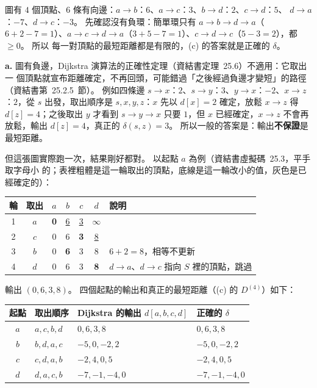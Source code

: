 \begin{pastsoln}
圖有 $4$ 個頂點、$6$ 條有向邊：$a \to b$：$6$、$a \to c$：$3$、$b \to d$：$2$、$c \to d$：$5$、
$d \to a$：$-7$、$d \to c$：$-3$。 先確認沒有負環：簡單環只有 $a \to b \to d \to a$（$6 + 2 - 7 =
1$）、$a \to c \to d \to a$（$3 + 5 - 7 = 1$）、$c \to d \to c$（$5 - 3 = 2$），都 $\ge 0$。 所以
每一對頂點的最短距離都是有限的，(c) 的答案就是正確的 $\delta$。

\textbf{a.} 圖有負邊，Dijkstra 演算法的正確性定理（資結書定理~25.6）不適用：它取出一
個頂點就宣布距離確定，不再回頭，可能錯過「之後經過負邊才變短」的路徑（資結書第~25.2.5~節）。
例如四條邊 $s \to x$：$2$、$s \to y$：$3$、$y \to x$：$-2$、$x \to z$：$2$，從 $s$ 出發，取出順序是
$s, x, y, z$：$x$ 先以 $d[x] = 2$ 確定，放鬆 $x \to z$ 得 $d[z] = 4$；之後取出 $y$ 才看到 $s \to y \to x$ 只要
$1$，但 $x$ 已經確定，$x \to z$ 不會再放鬆，輸出 $d[z] = 4$，真正的 $\delta(s, z) = 3$。 所以一般的答案是：輸出\textbf{不保證}是最短距離。

但這張圖實際跑一次，結果剛好都對。 以起點 $a$ 為例（資結書虛擬碼~25.3，平手取字母小
的；表裡粗體是這一輪取出的頂點，底線是這一輪改小的值，灰色是已經確定的）：

\begin{center}
\small
\begin{tabular}{cc*{4}{c}l}
\toprule
輪 & 取出 & $a$ & $b$ & $c$ & $d$ & 說明 \\
\midrule
1 & $a$ & \textbf{0} & \underline{6} & \underline{3} & $\infty$ & \\
2 & $c$ & \textcolor{black!45}{0} & $6$ & \textbf{3} & \underline{8} & \\
3 & $b$ & \textcolor{black!45}{0} & \textbf{6} & \textcolor{black!45}{3} & $8$ & $6 + 2 = 8$，相等不更新 \\
4 & $d$ & \textcolor{black!45}{0} & \textcolor{black!45}{6} & \textcolor{black!45}{3} & \textbf{8} & $d \to a$、$d \to c$ 指向 $S$ 裡的頂點，跳過 \\
\bottomrule
\end{tabular}
\end{center}

輸出 $(0, 6, 3, 8)$。 四個起點的輸出和真正的最短距離（(c) 的 $D^{(4)}$）如下：

\begin{center}
\small
\begin{tabular}{clll}
\toprule
起點 & 取出順序 & Dijkstra 的輸出 $d[a, b, c, d]$ & 正確的 $\delta$ \\
\midrule
$a$ & $a, c, b, d$ & $0, 6, 3, 8$ & $0, 6, 3, 8$ \\
$b$ & $b, d, a, c$ & $-5, 0, -2, 2$ & $-5, 0, -2, 2$ \\
$c$ & $c, d, a, b$ & $-2, 4, 0, 5$ & $-2, 4, 0, 5$ \\
$d$ & $d, a, c, b$ & $-7, -1, -4, 0$ & $-7, -1, -4, 0$ \\
\bottomrule
\end{tabular}
\end{center}


\end{pastsoln}
